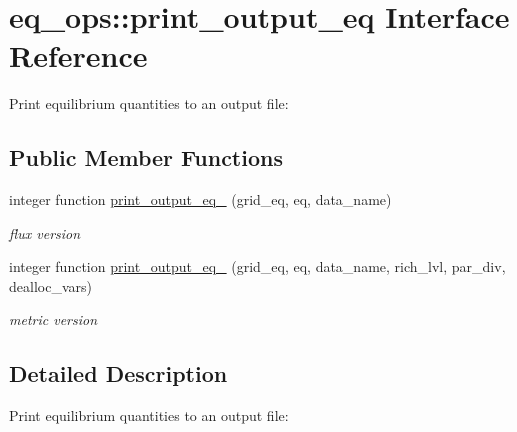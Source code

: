 \hypertarget{interfaceeq__ops_1_1print__output__eq}{}\section{eq\+\_\+ops\+:\+:print\+\_\+output\+\_\+eq Interface Reference}
\label{interfaceeq__ops_1_1print__output__eq}


Print equilibrium quantities to an output file\+:  


\subsection*{Public Member Functions}
\begin{DoxyCompactItemize}
\item 
integer function \hyperlink{interfaceeq__ops_1_1print__output__eq_a07fef57b633cc1b723405cb07d12ef24}{print\+\_\+output\+\_\+eq\+\_} (grid\+\_\+eq, eq, data\+\_\+name)
\begin{DoxyCompactList}\small\item\em flux version \end{DoxyCompactList}\item 
integer function \hyperlink{interfaceeq__ops_1_1print__output__eq_a7efa796c3c3e7cdbcb4fb51c9c6afcac}{print\+\_\+output\+\_\+eq\+\_} (grid\+\_\+eq, eq, data\+\_\+name, rich\+\_\+lvl, par\+\_\+div, dealloc\+\_\+vars)
\begin{DoxyCompactList}\small\item\em metric version \end{DoxyCompactList}\end{DoxyCompactItemize}


\subsection{Detailed Description}
Print equilibrium quantities to an output file\+: 


